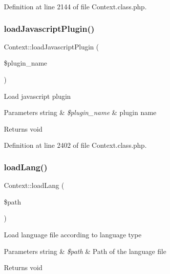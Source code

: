 Definition at line 2144 of file Context.\+class.\+php.

\hypertarget{classContext_acaea76bdc1334df9c2f088103d619593}{}\label{classContext_acaea76bdc1334df9c2f088103d619593} 
\subsubsection{\texorpdfstring{load\+Javascript\+Plugin()}{loadJavascriptPlugin()}}
{\footnotesize\ttfamily Context\+::load\+Javascript\+Plugin (\begin{DoxyParamCaption}\item[{}]{\$plugin\+\_\+name }\end{DoxyParamCaption})}

Load javascript plugin


\begin{DoxyParams}[1]{Parameters}
string & {\em \$plugin\+\_\+name} & plugin name \\
\hline
\end{DoxyParams}
\begin{DoxyReturn}{Returns}
void 
\end{DoxyReturn}


Definition at line 2402 of file Context.\+class.\+php.

\hypertarget{classContext_a7b22a741ff804e5cdaafd952273bd70c}{}\label{classContext_a7b22a741ff804e5cdaafd952273bd70c} 
\subsubsection{\texorpdfstring{load\+Lang()}{loadLang()}}
{\footnotesize\ttfamily Context\+::load\+Lang (\begin{DoxyParamCaption}\item[{}]{\$path }\end{DoxyParamCaption})}

Load language file according to language type


\begin{DoxyParams}[1]{Parameters}
string & {\em \$path} & Path of the language file \\
\hline
\end{DoxyParams}
\begin{DoxyReturn}{Returns}
void 
\end{DoxyReturn}


